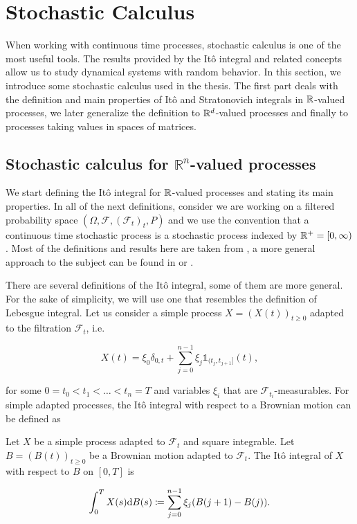 \section{Stochastic Calculus}

When working with continuous time processes, stochastic calculus is one of the most useful tools. The results provided by the Itô integral and related concepts allow us to study dynamical systems with random behavior. In this section, we introduce some stochastic calculus used in the thesis. The first part deals with the definition and main properties of Itô and Stratonovich integrals in $\mathbb R$-valued processes, we later generalize the definition to $\mathbb R^d$-valued processes and finally to processes taking values in spaces of matrices.

\subsection{Stochastic calculus for $\mathbb{R}^n$-valued processes}

We start defining the Itô integral for $\mathbb R$-valued processes and stating its main properties. In all of the next definitions, consider we are working on a filtered probability space $(\Omega, \mathscr F, (\mathscr F_t)_t, P)$ and we use the convention that a continuous time stochastic process is a stochastic process indexed by $\mathbb R^+ = [0,\infty)$. Most of the definitions and results here are taken from \cite{book:klebaner}, a more general approach to the subject can be found in \cite{book:karatzas} or \cite{book:revuzyor}.

There are several definitions of the Itô integral, some of them are more general. For the sake of simplicity, we will use one that resembles the definition of Lebesgue integral. Let us consider a simple process $X = (X(t))_{t\ge0}$ adapted to the filtration $\mathscr F_t$, i.e.

\begin{equation*}
    X(t) = \xi_0\delta_{0,t} + \sum_{j=0}^{n-1}  \xi_j \mathds 1_{(t_j,t_{j+1}]}(t),
\end{equation*}

\noindent for some $0=t_0 < t_1 < \dots < t_n = T$ and variables $\xi_i$ that are $\mathscr F_{t_i}$-measurables. For simple adapted processes, the Itô integral with respect to a Brownian motion can be defined as


\begin{definition} \label{def:itosimple}
    Let $X$ be a simple process adapted to $\mathscr F_t$ and square integrable. Let $B = (B(t))_{t\ge 0}$ be a Brownian motion adapted to $\mathscr F_t$. The Itô integral of $X$ with respect to $B$ on $[0,T]$ is 

    \begin{equation*}
        \int_0^T X(s) \mathrm d B(s) \coloneqq \sum_{j=0}^{n-1} \xi_j(B(j+1) - B(j)).
    \end{equation*}
\end{definition}

